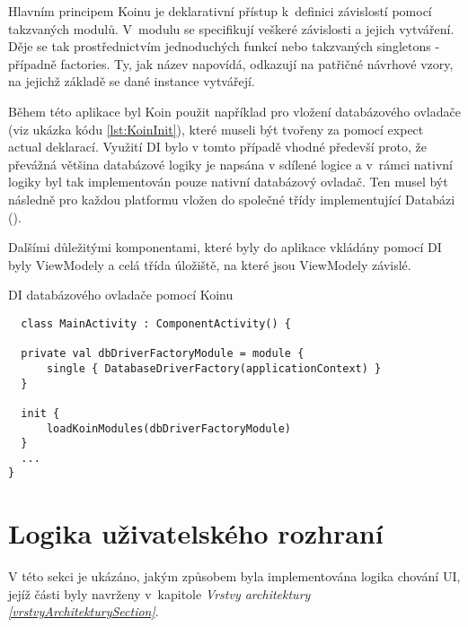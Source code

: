 Hlavním principem Koinu je deklarativní přístup k~definici závislostí pomocí takzvaných modulů. V~modulu se specifikují veškeré závislosti a 
jejich vytváření. Děje se tak prostřednictvím jednoduchých funkcí nebo takzvaných singletons - případně factories. Ty, jak název napovídá, odkazují na 
patřičné návrhové vzory, na jejichž základě se dané instance vytvářejí.


Během této aplikace byl Koin použit například pro vložení databázového ovladače (viz ukázka kódu \ref{lst:KoinInit}), které museli být tvořeny za pomocí expect 
actual deklarací.
Využití DI bylo v tomto případě vhodné předevší proto, že převážná většina databázové logiky je napsána v sdílené 
logice a v~rámci nativní logiky byl tak implementován pouze nativní databázový ovladač. Ten musel být následně pro každou platformu vložen do 
společné třídy implementující Databázi ().

Dalšími důležitými komponentami, které byly do aplikace vkládány pomocí DI byly ViewModely a celá třída úložiště, na které jsou ViewModely
závislé.

\begin{listing}[H]
\caption{DI databázového ovladače pomocí Koinu}\label{lst:KoinInit}
\begin{verbatim}
  class MainActivity : ComponentActivity() {

  private val dbDriverFactoryModule = module {
      single { DatabaseDriverFactory(applicationContext) }
  }

  init {
      loadKoinModules(dbDriverFactoryModule)
  }
  ...
}
\end{verbatim}
\end{listing}





\section{Logika uživatelského rozhraní} \label{UILayerImpl}
V této sekci je ukázáno, jakým způsobem byla implementována logika chování UI, jejíž části byly navrženy v~kapitole 
\textit{Vrstvy architektury \ref{vrstvyArchitekturySection}}. 


